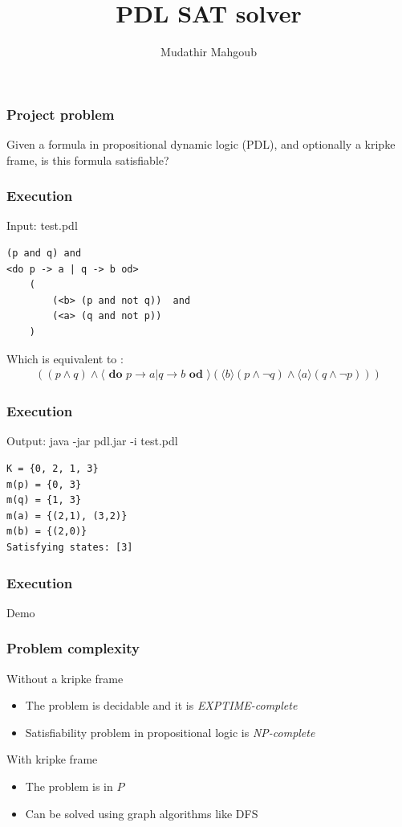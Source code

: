 \documentclass{beamer}
\title{PDL SAT solver}
\author{Mudathir Mahgoub}
\begin{document}
 
\frame{\titlepage}
 
\begin{frame}
\frametitle{Project problem}
Given a formula in propositional dynamic logic (PDL), and optionally a kripke frame, is this formula satisfiable?
\end{frame}

\begin{frame}[fragile]
\frametitle{Execution}
\scriptsize

\begin{block}{Input: test.pdl}
\begin{verbatim}
(p and q) and
<do p -> a | q -> b od>
    (
        (<b> (p and not q))  and
        (<a> (q and not p))
    )
\end{verbatim}
Which is equivalent to :
\begin{align*}
((p \wedge q) \wedge \langle\textbf{ do }p \rightarrow a \vert q \rightarrow b\textbf{ od }\rangle(\langle b\rangle(p \wedge \neg q) \wedge \langle a \rangle(q \wedge \neg p)))
\end{align*}
\end{block}
\end{frame}


\begin{frame}[fragile]
\frametitle{Execution}
\begin{block} {Output: java -jar pdl.jar -i test.pdl}
\small
\begin{lstlisting} 
K = {0, 2, 1, 3}
m(p) = {0, 3}
m(q) = {1, 3}
m(a) = {(2,1), (3,2)}
m(b) = {(2,0)}
Satisfying states: [3]
\end{lstlisting} 
\end{block}
\end{frame}

\begin{frame}[fragile]
\frametitle{Execution}
\huge
\centering

Demo

\end{frame}

\begin{frame}[fragile]
\frametitle{Problem complexity}
\begin{block}{Without a kripke frame}
\begin{itemize}
\item The problem is decidable and it is \textit{EXPTIME-complete}
\item Satisfiability problem in propositional logic is \textit{NP-complete}
 \vfill 
\end{itemize}

 \vfill 

\end{block}
\begin{block}{With kripke frame}
\begin{itemize}
\item The problem is in $P$
\item Can be solved using graph algorithms like DFS
\end{itemize}
\end{block}
\end{frame}
\end{document}
